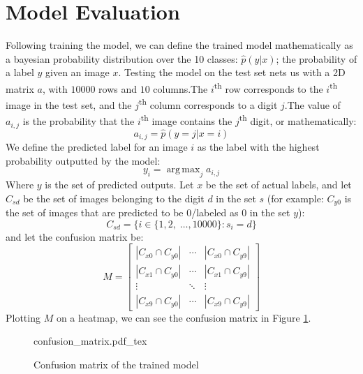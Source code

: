 \documentclass[conference]{IEEEtran}
\DeclareMathOperator*{\argmax}{arg\,max}
\begin{document}
\section{Model Evaluation}
Following training the model, we can define the trained model mathematically as a bayesian probability distribution over the 10 classes: $\hat{p}(y | x)$; the probability of a label $y$ given an image $x$.
Testing the model on the test set nets us with a 2D matrix $a$, with $10000$ rows and $10$ columns.\@ The $i$\textsuperscript{th} row corresponds to the $i$\textsuperscript{th} image in the test set, and the $j$\textsuperscript{th} column corresponds to a digit $j$.\@ The value of $a_{i,j}$ is the probability that the $i$\textsuperscript{th} image contains the $j$\textsuperscript{th} digit, or mathematically:
\begin{equation}
    a_{i,j} = \hat{p}(y = j | x = i)
\end{equation}
We define the predicted label for an image $i$ as the label with the highest probability outputted by the model:
\begin{equation}
    y_i = \argmax_j a_{i,j}
\end{equation}
Where $y$ is the set of predicted outputs. Let $x$ be the set of actual labels, and let $C_{sd}$ be the set of images belonging to the digit $d$ in the set $s$ (for example: $C_{y0}$ is the set of images that are predicted to be 0/labeled as 0 in the set $y$):
\begin{equation}
    C_{sd} = \{i \in \{1, 2, \;\ldots, 10000\} : s_i = d\}
\end{equation}
and let the confusion matrix be:
\begin{equation}
    M = \begin{bmatrix}
        |C_{x0} \cap C_{y0}| &  \cdots & |C_{x0} \cap C_{y9}| \\
        |C_{x1} \cap C_{y0}| &  \cdots & |C_{x1} \cap C_{y9}| \\
        \vdots & \ddots & \vdots \\
        |C_{x9} \cap C_{y0}| &  \cdots & |C_{x9} \cap C_{y9}|
    \end{bmatrix}
\end{equation}
Plotting $M$ on a heatmap, we can see the confusion matrix in Figure \ref{fig:confusion_matrix}.
\begin{figure}[!htp]
    \centering
    \def\svgwidth{\columnwidth}
    \scriptsize
    {confusion_matrix.pdf_tex}
    \caption{Confusion matrix of the trained model}\label{fig:confusion_matrix}
\end{figure}
\end{document}
